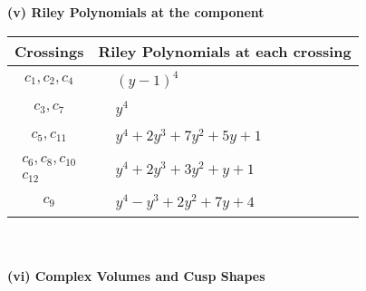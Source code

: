 \documentclass[1p]{elsarticle_modified}
\theoremstyle{definition}
\begin{document}
\newpage\renewcommand{\arraystretch}{1}
\flushleft \textbf{(v) Riley Polynomials at the component}\newline \\
\begin{tabular}{m{50pt}|m{274pt}}
Crossings & \hspace{64pt}Riley Polynomials at each crossing \\
\hline $$\begin{aligned}c_{1},c_{2},c_{4}\end{aligned}$$&$\begin{aligned}
&(y-1)^4
\end{aligned}$\\
\hline $$\begin{aligned}c_{3},c_{7}\end{aligned}$$&$\begin{aligned}
&y^4
\end{aligned}$\\
\hline $$\begin{aligned}c_{5},c_{11}\end{aligned}$$&$\begin{aligned}
&y^4+2 y^3+7 y^2+5 y+1
\end{aligned}$\\
\hline $$\begin{aligned}c_{6},c_{8},c_{10}\\c_{12}\end{aligned}$$&$\begin{aligned}
&y^4+2 y^3+3 y^2+y+1
\end{aligned}$\\
\hline $$\begin{aligned}c_{9}\end{aligned}$$&$\begin{aligned}
&y^4- y^3+2 y^2+7 y+4
\end{aligned}$\\
\hline
\end{tabular}\\~\\
\newpage\flushleft \textbf{(vi) Complex Volumes and Cusp Shapes}
\end{document}

